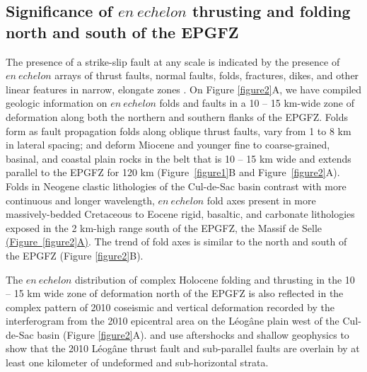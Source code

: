\documentclass[linenumbers,draft]{agujournal}
\begin{document}
\subsection{Significance of $en~echelon$ thrusting and folding north and south of the EPGFZ}
The presence of a strike-slip fault at any scale is indicated by the presence of $en~echelon$ arrays of thrust faults, normal faults, folds, fractures, dikes, and other linear features in narrow, elongate zones \citep{sylvester1988strike}. On Figure \ref{figure2}A, we have compiled geologic information on $en~echelon$ folds and faults in a 10 -- 15 km-wide zone of deformation along both the northern and southern flanks of the EPGFZ. Folds form as fault propagation folds along oblique thrust faults, vary from 1 to 8 km in lateral spacing; and deform Miocene and younger fine to coarse-grained, basinal, and coastal plain rocks in the belt that is 10 -- 15 km wide and extends parallel to the EPGFZ for 120 km (Figure~\ref{figure1}B and Figure~\ref{figure2}A). Folds in Neogene clastic lithologies of the Cul-de-Sac basin contrast with more continuous and longer wavelength, $en~echelon$ fold axes present in more massively-bedded Cretaceous to Eocene rigid, basaltic, and carbonate lithologies exposed in the 2 km-high range south of the EPGFZ, the Massif de Selle \ul{(Figure~{\ref{figure2}}A)}. The trend of fold axes is similar to the north and south of the EPGFZ (Figure \ref{figure2}B). 

The $en~echelon$ distribution of complex Holocene folding and thrusting in the 10 -- 15 km wide zone of deformation north of the EPGFZ is also reflected in the complex pattern of 2010 coseismic and vertical deformation recorded by the interferogram from the 2010 epicentral area on the L\'eog\^ane plain west of the Cul-de-Sac basin \citep{hayes2010complex,hashimoto2011fan,bilham2013remote} (Figure \ref{figure2}A). \citet{douilly2013crustal,douilly2015three} and \citet{kocel2016near} use aftershocks and shallow geophysics to show that the 2010 L\'eog\^ane thrust fault and sub-parallel faults are overlain by at least one kilometer of undeformed and sub-horizontal strata.
\end{document}
